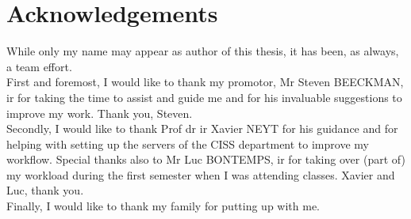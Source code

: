 \chapter*{Acknowledgements}
While only my name may appear as author of this thesis, it has been, as always, a team effort.\\
First and foremost, I would like to thank my promotor, Mr Steven BEECKMAN, ir for taking the time to assist and guide me and for his invaluable suggestions to improve my work. Thank you, Steven.\\
Secondly, I would like to thank Prof dr ir  Xavier NEYT for his guidance and for helping with setting up the servers of the CISS department to improve my workflow. Special thanks also to Mr Luc BONTEMPS, ir for taking over (part of) my workload during the first semester when I was attending classes. Xavier and Luc, thank you.\\
Finally, I would like to thank my family for putting up with me.

